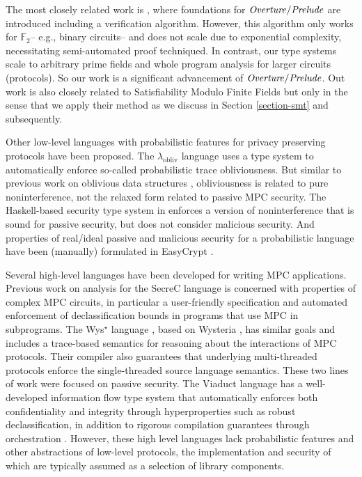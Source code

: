 
The most closely related work is \cite{skalka-near-ppdp24}, where
foundations for $\mathit{Overture}/\mathit{Prelude}$ are introduced including a
verification algorithm. However, this algorithm only works for
$\mathbb{F}_2$-- e.g., binary circuits-- and does not scale due to
exponential complexity, necessitating semi-automated proof
techniqued. In contrast, our type systems scale to arbitrary prime
fields and whole program analysis for larger circuits (protocols). So
our work is a significant advancement of $\mathit{Overture}/\mathit{Prelude}$.  Out
work is also closely related to Satisfiability Modulo Finite Fields
\cite{SMFF} but only in the sense that we apply their method as we
discuss in Section \ref{section-smt} and subsequently.

Other low-level languages with probabilistic features for privacy
preserving protocols have been proposed. The
$\lambda_{\mathrm{obliv}}$ language \cite{darais2019language} uses a
type system to automatically enforce so-called probabilistic trace
obliviousness.  But similar to previous work on oblivious data
structures \cite{10.1145/3498713}, obliviousness is related to pure
noninterference, not the relaxed form related to passive MPC
security. The Haskell-based security type system in \cite{6266151}
enforces a version of noninterference that is sound for passive
security, but does not consider malicious security. And properties of
real/ideal passive and malicious security for a probabilistic language
have been (manually) formulated in EasyCrypt \cite{8429300}.

\compwrapfig

Several high-level languages have been developed for writing MPC
applications. Previous work on analysis for the
SecreC language \cite{almeida2018enforcing,10.1145/2637113.2637119} is
concerned with properties of complex MPC circuits, in particular a
user-friendly specification and automated enforcement of
declassification bounds in programs that use MPC in subprograms. The
Wys$^\star$ language \cite{wysstar}, based on Wysteria
\cite{rastogi2014wysteria}, has similar goals and includes a
trace-based semantics for reasoning about the interactions of MPC
protocols. Their compiler also guarantees that underlying
multi-threaded protocols enforce the single-threaded source language
semantics. These two lines of work were focused on passive
security. The Viaduct language \cite{10.1145/3453483.3454074} has a
well-developed information flow type system that automatically
enforces both confidentiality and integrity through hyperproperties
such as robust declassification, in addition to rigorous compilation
guarantees through orchestration \cite{viaduct-UC}. However, these
high level languages lack probabilistic features and other
abstractions of low-level protocols, the implementation and security
of which are typically assumed as a selection of library components.

